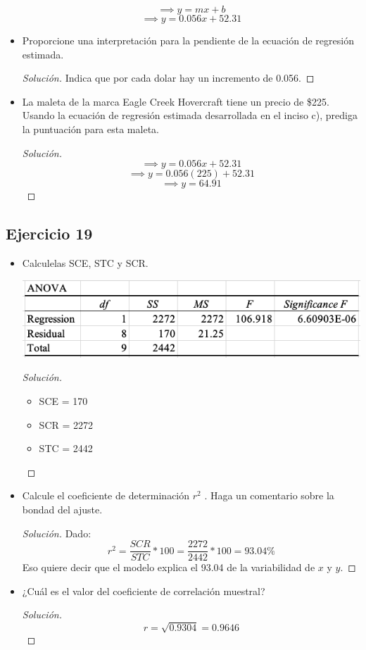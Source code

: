 \documentclass[a4paper,12pt]{article}
\newenvironment{solution}
  {\renewcommand\qedsymbol{$\blacksquare$}\begin{proof}[Solución]}
  {\end{proof}}
\begin{document}
\begin{itemize}
   $$\implies y= mx+b$$
   $$\implies y= 0.056x+52.31$$
    \item Proporcione una interpretación para la pendiente de la ecuación de regresión estimada.
    \begin{solution}
    Indica que por cada dolar hay un incremento de 0.056.
    \end{solution}
    \item  La maleta de la marca Eagle Creek Hovercraft tiene un precio de \$225. Usando la ecuación de regresión estimada desarrollada en el inciso c), prediga la puntuación para esta maleta.
    \begin{solution}
    $$\implies y= 0.056x+52.31$$
    $$\implies y= 0.056(225)+52.31$$
    $$\implies y= 64.91$$
    \end{solution}
\end{itemize}
\subsection{Ejercicio 19}
\begin{itemize}
    \item Calculelas SCE, STC y SCR.
    \begin{center}
        \includegraphics[scale=0.5]{Imagenes/19-1.png}
    \end{center}
    \begin{solution}
    \begin{itemize}
        \item SCE = 170
        \item SCR = 2272
        \item STC = 2442
    \end{itemize}
    \end{solution}
     \item Calcule el coeficiente de determinación $r^2$ . Haga un comentario sobre la bondad del ajuste.
     \begin{solution}
     Dado: 
     $$r^2= \frac{SCR}{STC}*100= \frac{2272}{2442}*100=93.04\% $$
     Eso quiere decir que el modelo explica el 93.04 de la variabilidad de $x$ y $y$. 
     \end{solution}
     \item ¿Cuál es el valor del coeficiente de correlación muestral?
     \begin{solution}
     $$r=\sqrt{0.9304}=0.9646$$
     \end{solution}
\end{itemize}
\end{document}
